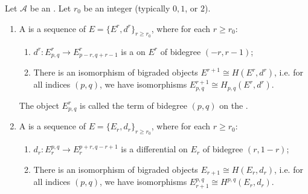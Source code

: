 \begin{definition} \label{definition:spectral_sequence_in_an_abelian_category}
    Let $\mathcal{A}$ be an . Let $r_0$ be an integer (typically $0, 1$, or $2$).
    \begin{enumerate}
    \item A  is a sequence of  $E = \{E^r, d^r\}_{r \ge r_0}$, where for each $r \ge r_0$:
    \begin{enumerate}
        \item $d^r: E^r_{p,q} \to E^r_{p-r, q+r-1}$ is a  on $E^r$ of bidegree $(-r, r-1)$;
        \item There is an isomorphism of bigraded objects $E^{r+1} \cong H(E^r, d^r)$, i.e. for all indices $(p,q)$, we have isomorphisms $E^{r+1}_{p,q} \cong H_{p,q}(E^r, d^r)$.
    \end{enumerate}
    The object $E^r_{p,q}$ is called the term of bidegree $(p,q)$ on the .

    \item A  is a sequence of  $E = \{E_r, d_r\}_{r \ge r_0}$, where for each $r \ge r_0$:
    \begin{enumerate}
        \item $d_r: E_r^{p,q} \to E_r^{p+r, q-r+1}$ is a differential on $E_r$ of bidegree $(r, 1-r)$;
        \item There is an isomorphism of bigraded objects $E_{r+1} \cong H(E_r, d_r)$, i.e. for all indices $(p,q)$, we have isomorphisms $E_{r+1}^{p,q} \cong H^{p,q}(E_r, d_r)$.
    \end{enumerate}
    \end{enumerate}
\end{definition}